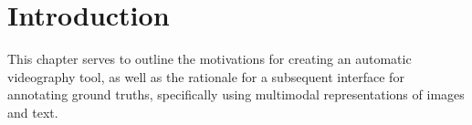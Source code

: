 \documentclass{l4proj}
\begin{document}
\def\consentname {Stergious Aji} %
\def\consentdate {\today} %
\educationalconsent


\tableofcontents
%
%
%

%
%
%
%
\chapter{Introduction}

This chapter serves to outline the motivations for creating an automatic videography tool, as well as the rationale for a subsequent interface for annotating ground truths, specifically using multimodal representations of images and text. 

\end{document}

